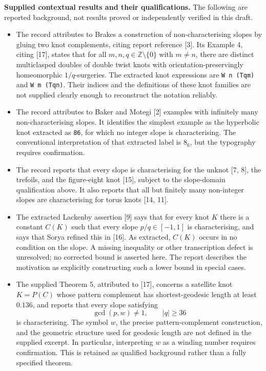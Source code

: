 \documentclass[11pt]{article}
\newcommand{\Z}{\mathbb{Z}}
\begin{document}
\textbf{Supplied contextual results and their qualifications.} The following are reported background, not results proved or independently verified in this draft.
\begin{itemize}
\item The record attributes to Brakes a construction of non-characterising slopes by gluing two knot complements, citing report reference [3]. Its Example 4, citing [17], states that for all \(m,n,q\in\Z\setminus\{0\}\) with \(m\ne n\), there are distinct multiclasped doubles of double twist knots with orientation-preservingly homeomorphic \(1/q\)-surgeries. The extracted knot expressions are \texttt{W n (Tqm)} and \texttt{W m (Tqn)}. Their indices and the definitions of these knot families are not supplied clearly enough to reconstruct the notation reliably.
\item The record attributes to Baker and Motegi [2] examples with infinitely many non-characterising slopes. It identifies the simplest example as the hyperbolic knot extracted as \texttt{86}, for which no integer slope is characterising. The conventional interpretation of that extracted label is \(8_6\), but the typography requires confirmation.
\item The record reports that every slope is characterising for the unknot [7, 8], the trefoils, and the figure-eight knot [15], subject to the slope-domain qualification above. It also reports that all but finitely many non-integer slopes are characterising for torus knots [14, 11].
\item The extracted Lackenby assertion [9] says that for every knot \(K\) there is a constant \(C(K)\) such that every slope \(p/q\in[-1,1]\) is characterising, and says that Sorya refined this in [16]. As extracted, \(C(K)\) occurs in no condition on the slope. A missing inequality or other transcription defect is unresolved; no corrected bound is asserted here. The report describes the motivation as explicitly constructing such a lower bound in special cases.
\item The supplied Theorem 5, attributed to [17], concerns a satellite knot \(K=P(C)\) whose pattern complement has shortest-geodesic length at least \(0.136\), and reports that every slope satisfying
\[
\gcd(p,w)\ne1,\qquad |q|\ge36
\]
is characterising. The symbol \(w\), the precise pattern-complement construction, and the geometric structure used for geodesic length are not defined in the supplied excerpt. In particular, interpreting \(w\) as a winding number requires confirmation. This is retained as qualified background rather than a fully specified theorem.

\end{itemize}
\end{document}
